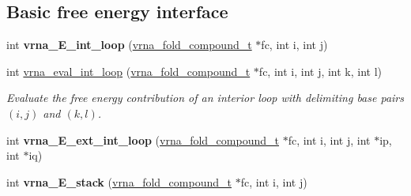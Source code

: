\subsection*{Basic free energy interface}
\begin{DoxyCompactItemize}
\item 
\mbox{\label{group__eval__loops__int_gab927db1b264b253a9acd5e63ab5404a1}} 
int {\bfseries vrna\+\_\+\+E\+\_\+int\+\_\+loop} (\mbox{\hyperlink{group__fold__compound_ga1b0cef17fd40466cef5968eaeeff6166}{vrna\+\_\+fold\+\_\+compound\+\_\+t}} $\ast$fc, int i, int j)
\item 
int \mbox{\hyperlink{group__eval__loops__int_gaab3547bfcdc39d89babbc7ed2a1a4b65}{vrna\+\_\+eval\+\_\+int\+\_\+loop}} (\mbox{\hyperlink{group__fold__compound_ga1b0cef17fd40466cef5968eaeeff6166}{vrna\+\_\+fold\+\_\+compound\+\_\+t}} $\ast$fc, int i, int j, int k, int l)
\begin{DoxyCompactList}\small\item\em Evaluate the free energy contribution of an interior loop with delimiting base pairs $(i,j)$ and $(k,l)$. \end{DoxyCompactList}\item 
\mbox{\label{group__eval__loops__int_gadad05dffc71e28377acdcedde9a3d9fc}} 
int {\bfseries vrna\+\_\+\+E\+\_\+ext\+\_\+int\+\_\+loop} (\mbox{\hyperlink{group__fold__compound_ga1b0cef17fd40466cef5968eaeeff6166}{vrna\+\_\+fold\+\_\+compound\+\_\+t}} $\ast$fc, int i, int j, int $\ast$ip, int $\ast$iq)
\item 
\mbox{\label{group__eval__loops__int_ga75bade120c653de9959a1e0eab879ab9}} 
int {\bfseries vrna\+\_\+\+E\+\_\+stack} (\mbox{\hyperlink{group__fold__compound_ga1b0cef17fd40466cef5968eaeeff6166}{vrna\+\_\+fold\+\_\+compound\+\_\+t}} $\ast$fc, int i, int j)
\end{DoxyCompactItemize}
